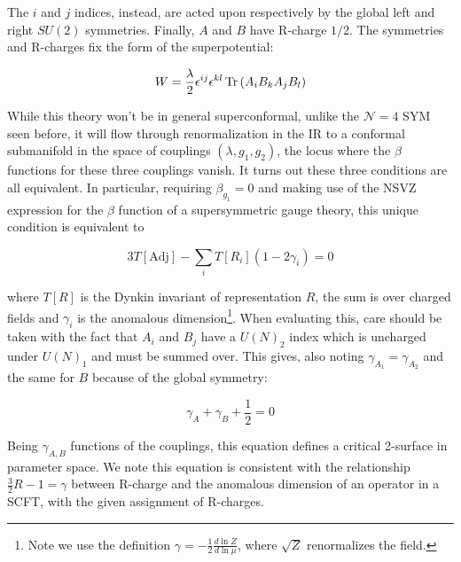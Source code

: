 
The $i$ and $j$ indices, instead, are acted upon respectively by the global left and right $SU(2)$ symmetries. Finally, $A$ and $B$ have R-charge $1/2$. The symmetries and R-charges fix the form of the superpotential:

\begin{equation}
	W = \frac{\lambda}{2} \epsilon^{ij} \epsilon^{kl} \operatorname{Tr} \left( A_i B_k A_j B_l \right)
	\label{}
\end{equation}

While this theory won't be in general superconformal, unlike the $\mathcal{N}=4$ SYM seen before, it will flow through renormalization in the IR to a conformal submanifold in the space of couplings $(\lambda,g_1,g_2)$, the locus where the $\beta$ functions for these three couplings vanish. It turns out these three conditions are all equivalent. In particular, requiring $\beta_{g_1} = 0$ and making use of the NSVZ expression for the $\beta$ function of a supersymmetric gauge theory, this unique condition is equivalent to


\begin{equation}
	3 T[\mathrm{Adj}] - \sum_i T[R_i] ( 1- 2\gamma_i) = 0
	\label{}
\end{equation}

where $T[R]$ is the Dynkin invariant of representation $R$, the sum is over charged fields and $\gamma_i$ is the anomalous dimension\footnote{Note we use the definition $\gamma = -\frac{1}{2}\frac{d\ln Z}{d \ln \mu}$, where $\sqrt Z$ renormalizes the field.}. When evaluating this, care should be taken with the fact that $A_i$ and $B_j$ have a $U(N)_2$ index which is uncharged under $U(N)_1$ and must be summed over. This gives, also noting $\gamma_{A_1} = \gamma_{A_2}$ and the same for $B$ because of the global symmetry:

\begin{equation}
	\gamma_A + \gamma_B + \frac{1}{2} = 0
	\label{}
\end{equation}

Being $\gamma_{A,B}$ functions of the couplings, this equation defines a critical 2-surface in parameter space. We note this equation is consistent with the relationship $\frac{3}{2}R-1 = \gamma$ between R-charge and the anomalous dimension of an operator in a SCFT, with the given assignment of R-charges.


